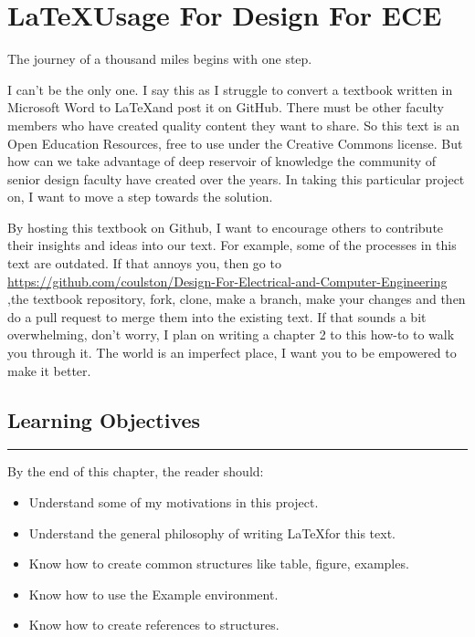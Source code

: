\chapter{\LaTeX Usage For Design For ECE}
\label{chapter:latexUsage}
\graphicspath{ {./chapter01/Fig} }

\begin{itquote}
The journey of a thousand miles begins with one step.
\end{itquote}

I can't be the only one.  I say this as I struggle to convert a textbook written
in Microsoft Word to \LaTeX and post it on GitHub.  There must be other faculty
members who have created quality content they want to share.
So this text is an Open Education Resources, free to use under the Creative
Commons license.  But how can we take advantage of deep reservoir of 
knowledge the community of senior design faculty have created over the
years.   In taking this particular project on, I want to move a step
towards the solution.

By hosting this textbook on Github, I want to encourage others to contribute 
their insights and ideas into our text.  For example, some of the processes in
this text are outdated. If that annoys you, then go to \\
\url{https://github.com/coulston/Design-For-Electrical-and-Computer-Engineering}\\
,the textbook repository,
fork, clone, make a branch, make your changes and
then do a pull request to merge them into the existing text.  If that sounds a 
bit overwhelming, don't worry, I plan on writing a chapter 2 to this how-to
to walk you through it.  The world is an imperfect place, I want you to be 
empowered to make it better.

\section*{Learning Objectives}
\noindent\rule{\linewidth}{1pt}
By the end of this chapter, the reader should:
\begin{itemize}
\item 	Understand some of my motivations in this project.
\item 	Understand the general philosophy of writing \LaTeX for this text.
\item Know how to create common structures like table, figure, examples.
\item Know how to use the Example environment.
\item Know how to create references to structures.
\end{itemize}

